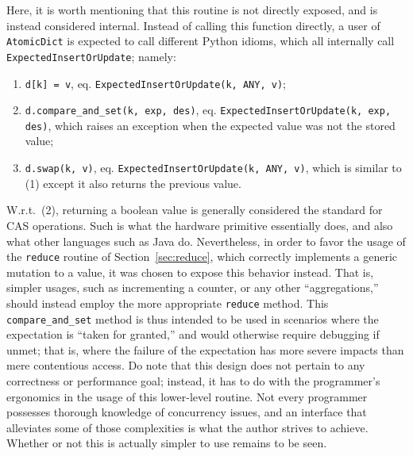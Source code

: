Here, it is worth mentioning that this routine is not directly exposed, and is instead considered internal.
Instead of calling this function directly, a user of \texttt{AtomicDict} is expected to call different Python idioms, which all internally call \texttt{ExpectedInsertOrUpdate}; namely:

\begin{enumerate}
    \item \texttt{{d[k] = v}}, eq. \texttt{{ExpectedInsertOrUpdate(k, ANY, v)}};
    \item \texttt{{d.compare\_and\_set(k, exp, des)}}, eq. \texttt{{ExpectedInsertOrUpdate(k, exp, des)}}, which raises an exception when the expected value was not the stored value;
    \item \texttt{{d.swap(k, v)}}, eq. \texttt{{ExpectedInsertOrUpdate(k, ANY, v)}}, which is similar to (1) except it also returns the previous value.
\end{enumerate}

W.r.t.\ (2), returning a boolean value is generally considered the standard for CAS operations.
Such is what the hardware primitive essentially does, and also what other languages such as Java do.
Nevertheless, in order to favor the usage of the \texttt{reduce} routine of Section~\ref{sec:reduce}, which correctly implements a generic mutation to a value, it was chosen to expose this behavior instead.
That is, simpler usages, such as incrementing a counter, or any other ``aggregations,'' should instead employ the more appropriate \texttt{reduce} method.
This \texttt{compare\_and\_set} method is thus intended to be used in scenarios where the expectation is ``taken for granted,'' and would otherwise require debugging if unmet; that is, where the failure of the expectation has more severe impacts than mere contentious access.
Do note that this design does not pertain to any correctness or performance goal; instead, it has to do with the programmer's ergonomics in the usage of this lower-level routine.
Not every programmer possesses thorough knowledge of concurrency issues, and an interface that alleviates some of those complexities is what the author strives to achieve.
Whether or not this is actually simpler to use remains to be seen.

